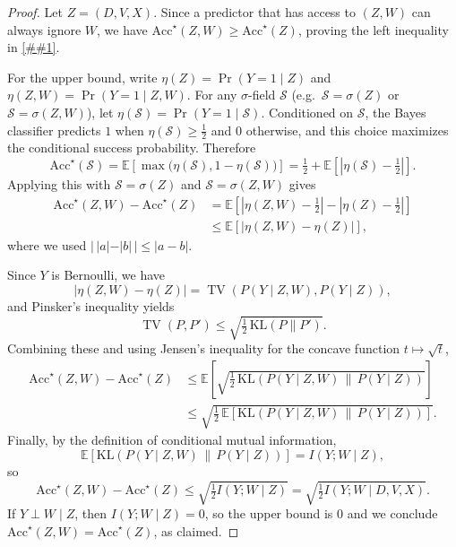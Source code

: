 \documentclass{article} %
\newcommand{\Cref}[1]{\ref{##1}}
\begin{document}
\begin{proof}
Let $Z=(D,V,X)$. Since a predictor that has access to $(Z,W)$ can always ignore $W$, we have
$\mathrm{Acc}^\star(Z,W)\ge \mathrm{Acc}^\star(Z)$, proving the left inequality in \Cref{prop:elicitation_conf}.

For the upper bound, write $\eta(Z)=\Pr(Y=1\mid Z)$ and $\eta(Z,W)=\Pr(Y=1\mid Z,W)$.
For any $\sigma$-field $\mathcal{S}$ (e.g.\ $\mathcal{S}=\sigma(Z)$ or $\mathcal{S}=\sigma(Z,W)$), let $\eta(\mathcal{S})=\Pr(Y=1\mid \mathcal{S})$.
Conditioned on $\mathcal{S}$, the Bayes classifier predicts $1$ when $\eta(\mathcal{S})\ge \tfrac12$ and $0$ otherwise, and this choice maximizes the conditional success probability.
Therefore
\[
\mathrm{Acc}^\star(\mathcal{S})
=
\mathbb{E}\!\left[\max\bigl(\eta(\mathcal{S}),1-\eta(\mathcal{S})\bigr)\right]
=
\tfrac12+\mathbb{E}\!\left[\left|\eta(\mathcal{S})-\tfrac12\right|\right].
\]
Applying this with $\mathcal{S}=\sigma(Z)$ and $\mathcal{S}=\sigma(Z,W)$ gives
\begin{align*}
\mathrm{Acc}^\star(Z,W)-\mathrm{Acc}^\star(Z)
&=
\mathbb{E}\!\left[\left|\eta(Z,W)-\tfrac12\right|-\left|\eta(Z)-\tfrac12\right|\right] \\
&\le \mathbb{E}\!\left[\left|\eta(Z,W)-\eta(Z)\right|\right],
\end{align*}
where we used $|\,|a|-|b|\,|\le |a-b|$.

Since $Y$ is Bernoulli, we have
\[
\left|\eta(Z,W)-\eta(Z)\right|
=
\operatorname{TV}\!\left(P(Y\mid Z,W),P(Y\mid Z)\right),
\]
and Pinsker's inequality yields
\[
\operatorname{TV}(P,P')\le \sqrt{\tfrac12\,\mathrm{KL}(P\|P')}.
\]
Combining these and using Jensen's inequality for the concave function $t\mapsto \sqrt{t}$,
\begin{align*}
\mathrm{Acc}^\star(Z,W)-\mathrm{Acc}^\star(Z)
&\le
\mathbb{E}\!\left[\sqrt{\tfrac12\,\mathrm{KL}\!\left(P(Y\mid Z,W)\,\|\,P(Y\mid Z)\right)}\right] \\
&\le
\sqrt{\tfrac12\,\mathbb{E}\!\left[\mathrm{KL}\!\left(P(Y\mid Z,W)\,\|\,P(Y\mid Z)\right)\right]}.
\end{align*}
Finally, by the definition of conditional mutual information,
\[
\mathbb{E}\!\left[\mathrm{KL}\!\left(P(Y\mid Z,W)\,\|\,P(Y\mid Z)\right)\right]=I(Y;W\mid Z),
\]
so
\[
\mathrm{Acc}^\star(Z,W)-\mathrm{Acc}^\star(Z)\le \sqrt{\tfrac12 I(Y;W\mid Z)}=\sqrt{\tfrac12 I(Y;W\mid D,V,X)}.
\]
If $Y \perp W \mid Z$, then $I(Y;W\mid Z)=0$, so the upper bound is $0$ and we conclude $\mathrm{Acc}^\star(Z,W)=\mathrm{Acc}^\star(Z)$, as claimed.
\end{proof}
\end{document}
